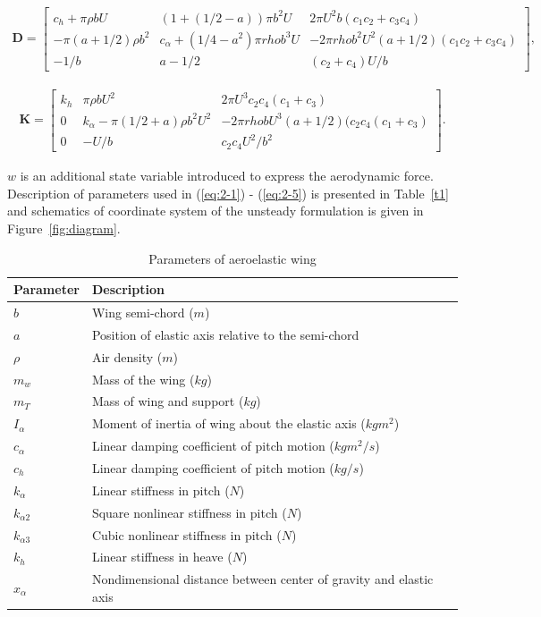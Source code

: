 \documentclass[openacc]{rsproca_new}%
\def\vec#1{\ensuremath{\mathbf{#1}}}
\newcommand{\Eref}[1]{(\ref{#1})}
\newcommand{\Fref}[1]{Figure~\ref{#1}}
\newcommand{\Tref}[1]{Table~\ref{#1}}
\begin{document}
\begin{align}\label{eq:2-4}
\vec D=
\begin{bmatrix}
      c_h+\pi \rho b U        & (1+(1/2-a))\pi b^2 U & 2 \pi U^2 b (c_1c_2+c_3c_4) \\
      -\pi (a+1/2)\rho b^2        & c_\alpha+(1/4-a^2)\pi rho b^3 U & -2 \pi rho b^2 U^2 (a+1/2)(c_1c_2+c_3c_4) \\
      -1/b       & a-1/2 & (c_2+c_4)U/b
\end{bmatrix},
\end{align}

\begin{align}\label{eq:2-5}
\vec K=
\begin{bmatrix}
      k_h        & \pi \rho b U^2  & 2 \pi U^3 c_2 c_4 (c_1+c_3) \\
      0         & k_\alpha - \pi (1/2+a)\rho b^2 U^2 & -2 \pi rho b U^3 (a+1/2)(c_2c_4(c_1+c_3) \\
      0       & -U/b & c_2 c_4U^2/b^2
\end{bmatrix}.
\end{align}

\noindent $w$ is an additional state variable introduced to express the aerodynamic force. Description of parameters used in \Eref{eq:2-1} -  \Eref{eq:2-5} is presented in \Tref{t1} and schematics of coordinate system of the unsteady formulation is given in \Fref{fig:diagram}.


\begin{table}[!ht]
\caption{Parameters of aeroelastic wing}%
\label{table_example}
\begin{tabular}{ll}%
\hline
Parameter &Description \\
\hline
$b$ & Wing semi-chord ($m$) \\
$a$ & Position of elastic axis relative to the semi-chord  \\
$\rho$ & Air density ($m$) \\
$m_w$ & Mass of the wing ($kg$) \\
$m_T$ & Mass of wing and support ($kg$) \\
$I_\alpha$ & Moment of inertia of wing about the elastic axis ($kg m^2$) \\
$c_\alpha$ & Linear damping coefficient of pitch motion ($kg m^2/s$) \\
$c_h$ & Linear damping coefficient of pitch motion ($kg/s$) \\
$k_\alpha$ & Linear stiffness in pitch ($N$) \\
$k_{\alpha 2}$ & Square nonlinear stiffness in pitch  ($N$) \\
$k_{\alpha 3}$ & Cubic nonlinear stiffness in pitch ($N$) \\
$k_{h}$ & Linear stiffness in heave ($N$) \\
$x_\alpha$ & Nondimensional distance between center of gravity and elastic axis  \\
\hline
\end{tabular}
\vspace*{-4pt}
\end{table}%
\end{document}
